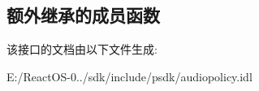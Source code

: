 \subsection*{额外继承的成员函数}


该接口的文档由以下文件生成\+:\begin{DoxyCompactItemize}
\item 
E\+:/\+React\+O\+S-\/0../sdk/include/psdk/audiopolicy.\+idl\end{DoxyCompactItemize}
